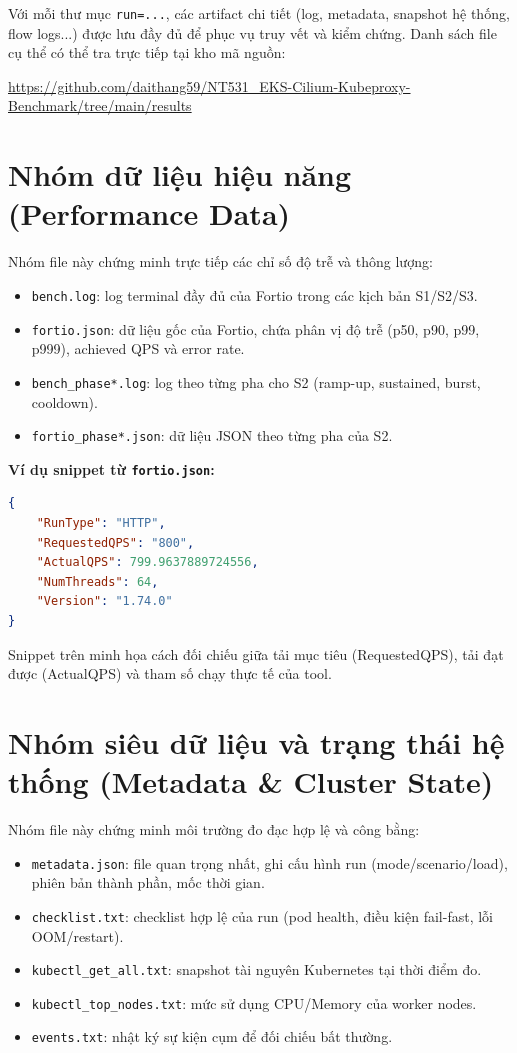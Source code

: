 Với mỗi thư mục \texttt{run=...}, các artifact chi tiết (log, metadata, snapshot hệ thống, flow logs...) được lưu đầy đủ để phục vụ truy vết và kiểm chứng. Danh sách file cụ thể có thể tra trực tiếp tại kho mã nguồn:

\begin{center}
\url{https://github.com/daithang59/NT531_EKS-Cilium-Kubeproxy-Benchmark/tree/main/results}
\end{center}

\section{Nhóm dữ liệu hiệu năng (Performance Data)}

Nhóm file này chứng minh trực tiếp các chỉ số độ trễ và thông lượng:

\begin{itemize}
	\item \texttt{bench.log}: log terminal đầy đủ của Fortio trong các kịch bản S1/S2/S3.
	\item \texttt{fortio.json}: dữ liệu gốc của Fortio, chứa phân vị độ trễ (p50, p90, p99, p999), achieved QPS và error rate.
	\item \texttt{bench\_phase*.log}: log theo từng pha cho S2 (ramp-up, sustained, burst, cooldown).
	\item \texttt{fortio\_phase*.json}: dữ liệu JSON theo từng pha của S2.
\end{itemize}

\textbf{Ví dụ snippet từ \texttt{fortio.json}:}

\begin{lstlisting}[language=json]
{
	"RunType": "HTTP",
	"RequestedQPS": "800",
	"ActualQPS": 799.9637889724556,
	"NumThreads": 64,
	"Version": "1.74.0"
}
\end{lstlisting}

Snippet trên minh họa cách đối chiếu giữa tải mục tiêu (RequestedQPS), tải đạt được (ActualQPS) và tham số chạy thực tế của tool.

\section{Nhóm siêu dữ liệu và trạng thái hệ thống (Metadata \& Cluster State)}

Nhóm file này chứng minh môi trường đo đạc hợp lệ và công bằng:

\begin{itemize}
	\item \texttt{metadata.json}: file quan trọng nhất, ghi cấu hình run (mode/scenario/load), phiên bản thành phần, mốc thời gian.
	\item \texttt{checklist.txt}: checklist hợp lệ của run (pod health, điều kiện fail-fast, lỗi OOM/restart).
	\item \texttt{kubectl\_get\_all.txt}: snapshot tài nguyên Kubernetes tại thời điểm đo.
	\item \texttt{kubectl\_top\_nodes.txt}: mức sử dụng CPU/Memory của worker nodes.
	\item \texttt{events.txt}: nhật ký sự kiện cụm để đối chiếu bất thường.
\end{itemize}


